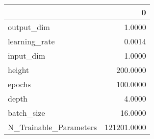 \begin{tabular}{lr}
\toprule
{} &            0 \\
\midrule
output\_dim             &       1.0000 \\
learning\_rate          &       0.0014 \\
input\_dim              &       1.0000 \\
height                 &     200.0000 \\
epochs                 &     100.0000 \\
depth                  &       4.0000 \\
batch\_size             &      16.0000 \\
N\_Trainable\_Parameters &  121201.0000 \\
\bottomrule
\end{tabular}
